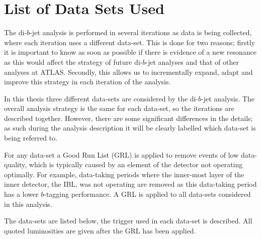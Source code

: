 \section{List of Data Sets Used}
\label{sec:evt-datasets}

The di-$b$-jet analysis is performed in several iterations
as data is being collected, where each iteration uses a different data-set.
This is done for two reasons;
firstly it is important to know as soon as possible
if there is evidence of a new resonance as
this would affect the strategy of future di-$b$-jet analyses and that of other analyses at ATLAS.
Secondly, this allows us to incrementally
expand, adapt and improve this strategy in each iteration of the analysis.

In this thesis three different data-sets are considered by the di-$b$-jet analysis.
The overall analysis strategy is the same for each data-set,
so the iterations are described together.
However, there are some significant differences in the details;
as such during the analysis description it will be clearly labelled
which data-set is being referred to.

For any data-set a Good Run List (GRL)
is applied to remove events of low data-quality,
which is typically caused by an element of the detector not operating optimally.
For example, data-taking periods where the inner-most layer of the inner detector,
the IBL, was not operating are removed as
this data-taking period has a lower $b$-tagging performance.
A GRL is applied to all data-sets considered in this analysis.

The data-sets are listed below, the trigger used in each data-set is described.
All quoted luminosities are given after the GRL has been applied.

